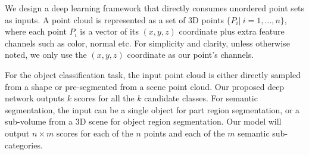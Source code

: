 \label{sec:problem}

We design a deep learning framework that directly consumes unordered point sets as inputs. %
A point cloud is represented as a set of 3D points $\{P_i| \ i=1,...,n\}$, where each point $P_i$ is a vector of its $(x,y,z)$ coordinate plus extra feature channels such as color, normal etc. For simplicity and clarity, unless otherwise noted, we only use the $(x,y,z)$ coordinate as our point's channels. %

For the object classification task, the input point cloud is either directly sampled from a shape or pre-segmented from a scene point cloud. Our proposed deep network %
outputs $k$ scores for all the $k$ candidate classes.
For semantic segmentation, the input can be a single object for part region segmentation, or a sub-volume from a 3D scene for object region segmentation. Our model will output $n \times m$ scores for each of the $n$ points and each of the $m$ semantic sub-categories.


